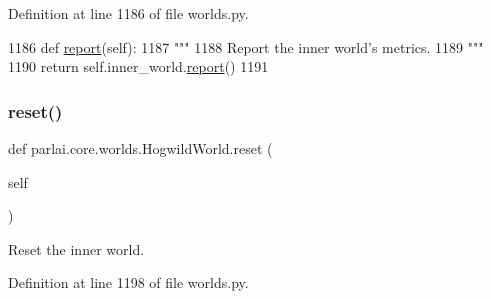 Definition at line 1186 of file worlds.\+py.


\begin{DoxyCode}
1186     \textcolor{keyword}{def }\hyperlink{namespaceprojects_1_1convai2_1_1eval__f1_a01a47b9c08dad189837a51f085defc45}{report}(self):
1187         \textcolor{stringliteral}{"""}
1188 \textcolor{stringliteral}{        Report the inner world's metrics.}
1189 \textcolor{stringliteral}{        """}
1190         \textcolor{keywordflow}{return} self.inner\_world.\hyperlink{namespaceprojects_1_1convai2_1_1eval__f1_a01a47b9c08dad189837a51f085defc45}{report}()
1191 
\end{DoxyCode}
\mbox{\label{classparlai_1_1core_1_1worlds_1_1HogwildWorld_ae72983e6af34391880979491ced1dde6}} 
\subsubsection{\texorpdfstring{reset()}{reset()}}
{\footnotesize\ttfamily def parlai.\+core.\+worlds.\+Hogwild\+World.\+reset (\begin{DoxyParamCaption}\item[{}]{self }\end{DoxyParamCaption})}

\begin{DoxyVerb}Reset the inner world.
\end{DoxyVerb}
 

Definition at line 1198 of file worlds.\+py.


